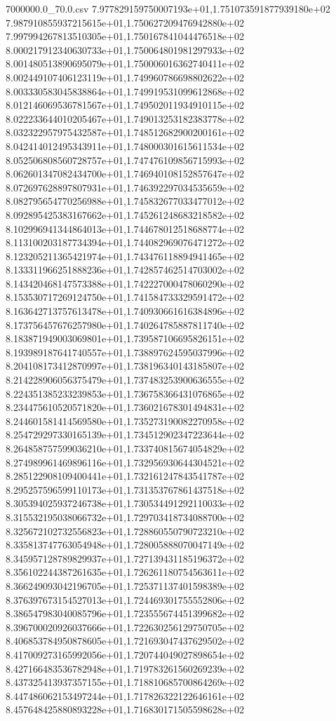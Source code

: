 \begin{filecontents*}{7000000.0_70.0.csv}
7.977829159750007193e+01,1.751073591877939180e+02
7.987910855937215615e+01,1.750627209476942880e+02
7.997994267813510305e+01,1.750167841044476518e+02
8.000217912340630733e+01,1.750064801981297933e+02
8.001480513890695079e+01,1.750006016362740411e+02
8.002449107406123119e+01,1.749960786698802622e+02
8.003330583045838864e+01,1.749919531099612868e+02
8.012146069536781567e+01,1.749502011934910115e+02
8.022233644010205467e+01,1.749013253182383778e+02
8.032322957975432587e+01,1.748512682900200161e+02
8.042414012495343911e+01,1.748000301615611534e+02
8.052506808560728757e+01,1.747476109856715993e+02
8.062601347082434700e+01,1.746940108152857647e+02
8.072697628897807931e+01,1.746392297034535659e+02
8.082795654770256988e+01,1.745832677033477012e+02
8.092895425383167662e+01,1.745261248683218582e+02
8.102996941344864013e+01,1.744678012518688774e+02
8.113100203187734394e+01,1.744082969076471272e+02
8.123205211365421974e+01,1.743476118894941465e+02
8.133311966251888236e+01,1.742857462514703002e+02
8.143420468147573388e+01,1.742227000478060290e+02
8.153530717269124750e+01,1.741584733329591472e+02
8.163642713757613478e+01,1.740930661616384896e+02
8.173756457676257980e+01,1.740264785887811740e+02
8.183871949003069801e+01,1.739587106695826151e+02
8.193989187641740557e+01,1.738897624595037996e+02
8.204108173412870997e+01,1.738196340143185807e+02
8.214228906056375479e+01,1.737483253900636555e+02
8.224351385233239853e+01,1.736758366431076865e+02
8.234475610520571820e+01,1.736021678301494831e+02
8.244601581414569580e+01,1.735273190082270958e+02
8.254729297330165139e+01,1.734512902347223644e+02
8.264858757599036210e+01,1.733740815674054829e+02
8.274989961469896116e+01,1.732956930644304521e+02
8.285122908109400441e+01,1.732161247843541787e+02
8.295257596599110173e+01,1.731353767861437518e+02
8.305394025937246738e+01,1.730534491292110033e+02
8.315532195038066732e+01,1.729703418734088700e+02
8.325672102732556823e+01,1.728860550790723210e+02
8.335813747763054948e+01,1.728005888070047149e+02
8.345957128789829937e+01,1.727139431185196372e+02
8.356102244387261635e+01,1.726261180754563611e+02
8.366249093042196705e+01,1.725371137401598389e+02
8.376397673154527013e+01,1.724469301755552806e+02
8.386547983040085796e+01,1.723555674451399682e+02
8.396700020926037666e+01,1.722630256129750705e+02
8.406853784950878605e+01,1.721693047437629502e+02
8.417009273165992056e+01,1.720744049027898654e+02
8.427166483536782948e+01,1.719783261560269239e+02
8.437325413937357155e+01,1.718810685700864269e+02
8.447486062153497244e+01,1.717826322122646161e+02
8.457648425880893228e+01,1.716830171505598628e+02

\end{filecontents*}
